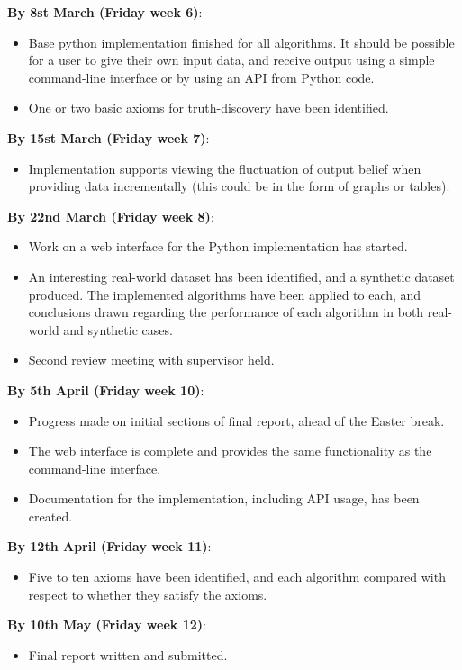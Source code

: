 \documentclass{article}
\begin{document}
\textbf{By 8st March (Friday week 6)}:
\begin{itemize}
\item Base python implementation finished for all algorithms. It should be
possible for a user to give their own input data, and receive output using a
simple command-line interface or by using an API from Python code.
\item One or two basic axioms for truth-discovery have been identified.
\end{itemize}

\textbf{By 15st March (Friday week 7)}:
\begin{itemize}
\item Implementation supports viewing the fluctuation of output belief when
providing data incrementally (this could be in the form of graphs or tables).
\end{itemize}

\textbf{By 22nd March (Friday week 8)}:
\begin{itemize}
\item Work on a web interface for the Python implementation has started.
\item An interesting real-world dataset has been identified, and a synthetic
dataset produced. The implemented algorithms have been applied to each, and
conclusions drawn regarding the performance of each algorithm in both
real-world and synthetic cases.
\item Second review meeting with supervisor held.
\end{itemize}

\textbf{By 5th April (Friday week 10)}:
\begin{itemize}
\item Progress made on initial sections of final report, ahead of the Easter
break.
\item The web interface is complete and provides the same functionality as the
command-line interface.
\item Documentation for the implementation, including API usage, has been created.
\end{itemize}

\textbf{By 12th April (Friday week 11)}:
\begin{itemize}
\item Five to ten axioms have been identified, and each algorithm compared with
respect to whether they satisfy the axioms.
\end{itemize}

\textbf{By 10th May (Friday week 12)}:
\begin{itemize}
\item Final report written and submitted.
\end{itemize}


{}

\end{document}
